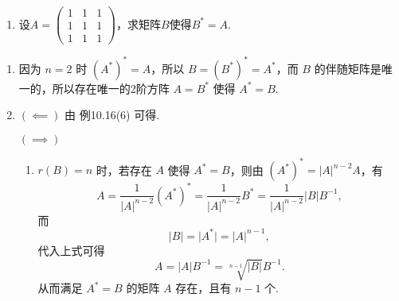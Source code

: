 \begin{exercise}
\begin{exgroup}
\begin{enumerate}
            \item 设$A=\begin{pmatrix}
                          1 & 1 & 1 \\ 1 & 1 & 1 \\ 1 & 1 & 1
                      \end{pmatrix}$，求矩阵$B$使得$B^*=A$.
        \end{enumerate}
        \begin{answer}
            \begin{enumerate}
                \item 因为 $n=2$ 时 $(A^*)^* = A$，所以 $B = (B^*)^* = A^*$，而 $B$ 的伴随矩阵是唯一的，所以存在唯一的2阶方阵 $A = B^*$ 使得 $A^* = B$.

                \item $(\impliedby)$ 由 {例10.16(6)} 可得. %

                      $(\implies)$ \begin{enumerate}
                          \item $r(B) = n$ 时，若存在 $A$ 使得 $A^* = B$，则由 $(A^*)^* = \lvert A \rvert^{n-2}A$，有
                                \[A = \dfrac{1}{\lvert A \rvert^{n-2}}(A^*)^* = \dfrac{1}{\lvert A \rvert^{n-2}}B^* = \dfrac{1}{\lvert A \rvert^{n-2}}\lvert B \rvert B^{-1},\]
                                而
                                \[\lvert B \rvert = \lvert A^* \rvert = \lvert A \rvert^{n-1},\]
                                代入上式可得
                                \[A = \lvert A \rvert B^{-1} = \sqrt[n-1]{\lvert B \rvert} B^{-1}.\]
                                从而满足 $A^* = B$ 的矩阵 $A$ 存在，且有 $n-1$ 个.


\end{enumerate}
\end{enumerate}
\end{answer}
\end{exgroup}
\end{exercise}
